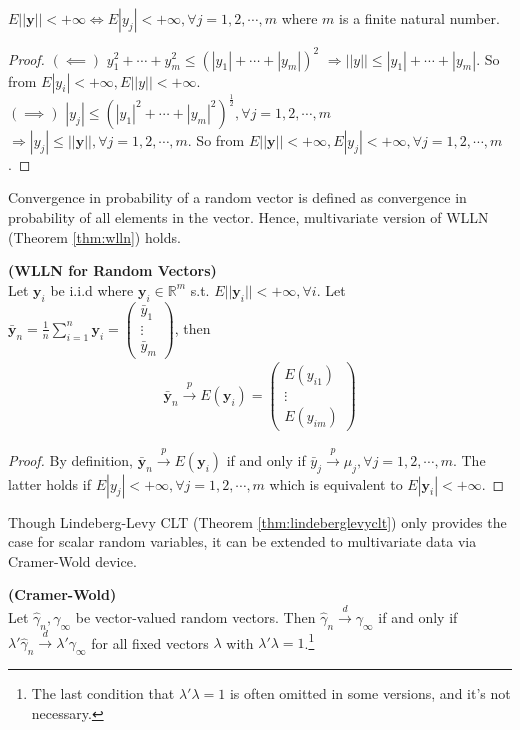 \documentclass[11pt]{article} %
\theoremstyle{definition}
\numberwithin{defn}{subsection}
\numberwithin{thm}{subsection}
\numberwithin{ex}{subsection}
\newcommand{\bb}[1]{\mathbb{#1}}
\newcommand{\R}{\bb{R}}
\newcommand{\plim}{\overset{p}{\rightarrow}}
\newcommand{\dlim}{\overset{d}{\rightarrow}}
\begin{document}
\begin{thm}
	$E||\bm{y}||<+\infty\Leftrightarrow E|y_j|<+\infty,\forall j=1,2,\cdots,m$ where $m$ is a finite natural number.
	\begin{proof}
		$(\impliedby)$ $y_1^2+\cdots+y_m^2\le(|y_1|+\cdots+|y_m|)^2$ $\Rightarrow||y||\le|y_1|+\cdots+|y_m|$. So from $E|y_i|<+\infty,E||y||<+\infty$.\\
		$(\implies)$ $|y_j|\le(|y_1|^2+\cdots+|y_m|^2)^{\frac{1}{2}},\forall j=1,2,\cdots,m$ $\Rightarrow|y_j|\le||\bm{y}||,\forall j=1,2,\cdots,m$. So from $E||\bm{y}||<+\infty,E|y_j|<+\infty,\forall j=1,2,\cdots,m$.
	\end{proof}
\end{thm}

Convergence in probability of a random vector is defined as convergence in probability of all elements in the vector. Hence, multivariate version of WLLN (Theorem \ref{thm:wlln}) holds.

\begin{thm}\label{thm:wlln(vector)}
	\textbf{(WLLN for Random Vectors)}\\
	Let $\bm{y}_i$ be i.i.d where $\bm{y}_i\in\R^m$ s.t. $E||\bm{y}_i||<+\infty,\forall i$. Let $\bar{\bm{y}}_n=\frac{1}{n}\sum_{i=1}^n \bm{y}_i=\begin{pmatrix}
	\bar{y}_1\\\vdots\\\bar{y}_m\end{pmatrix}$, then 
	\begin{align*}
	\bar{\bm{y}}_n\overset{p}{\rightarrow}E(\bm{y}_i)=\begin{pmatrix}E(y_{i1})\\\vdots\\E(y_{im})\end{pmatrix}
	\end{align*}
	\begin{proof}
		By definition, $\bar{\bm{y}}_n\plim E(\bm{y}_i)$ if and only if $\bar{y}_j\plim \mu_j,\forall j=1,2,\cdots,m$. The latter holds if $E|y_j|<+\infty,\forall j=1,2,\cdots,m$ which is equivalent to $E|\bm{y}_i|<+\infty$.
	\end{proof}
\end{thm}

Though Lindeberg-Levy CLT (Theorem \ref{thm:lindeberglevyclt}) only provides the case for scalar random variables, it can be extended to multivariate data via Cramer-Wold device.

\begin{thm}\label{thm:cramerwold}
	\textbf{(Cramer-Wold)}	\\
	Let $\hat{\gamma}_n,\gamma_{\infty}$ be vector-valued random vectors. Then $\hat{\gamma}_n\dlim \gamma_{\infty}$ if and only if $\lambda'\hat{\gamma}_n\dlim\lambda'\gamma_{\infty}$ for all fixed vectors $\lambda$ with $\lambda'\lambda=1$.\footnote{The last condition that $\lambda'\lambda=1$ is often omitted in some versions, and it's not necessary.}
\end{thm}
\end{document}
